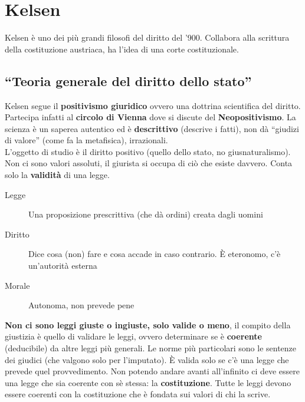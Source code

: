 
\section{Kelsen}
Kelsen è uno dei più grandi filosofi del diritto del '900. Collabora alla scrittura della 
costituzione austriaca, ha l'idea di una corte costituzionale.

\subsection{``Teoria generale del diritto dello stato''}
Kelsen segue il \textbf{positivismo giuridico} ovvero una dottrina scientifica del diritto. Partecipa
infatti al \textbf{circolo di Vienna} dove si discute del \textbf{Neopositivismo}. La scienza è un
saperea autentico ed è \textbf{descrittivo} (descrive i fatti), non dà ``giudizi di valore'' (come
fa la metafisica), irrazionali.\\ [\baselineskip]
L'oggetto di studio è il diritto positivo (quello dello stato, no giusnaturalismo). Non ci sono
valori assoluti, il giurista si occupa di ciò che esiste davvero. Conta solo la \textbf{validità} di
una legge.
\begin{description}
  \item[Legge] Una proposizione prescrittiva (che dà ordini) creata dagli uomini
  \item[Diritto] Dice cosa (non) fare e cosa accade in caso contrario. È eteronomo, c'è un'autorità
    esterna
  \item[Morale] Autonoma, non prevede pene
\end{description}
\textbf{Non ci sono leggi giuste o ingiuste, solo valide o meno}, il compito della giustizia è quello
di validare le leggi, ovvero determinare se è \textbf{coerente} (deducibile) da altre leggi più 
generali. Le norme più particolari sono le sentenze dei giudici (che valgono solo per l'imputato).
È valida solo se c'è una legge che prevede quel provvedimento. Non potendo andare avanti all'infinito
ci deve essere una legge che sia coerente con sè stessa: la \textbf{costituzione}. Tutte le leggi
devono essere coerenti con la costituzione che è fondata sui valori di chi la scrive.

